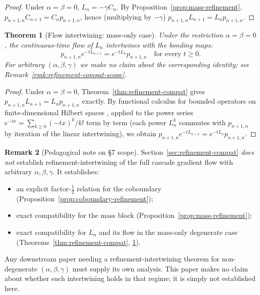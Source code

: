 \documentclass[11pt, a4paper]{amsart}
\newtheorem{theorem}{Theorem}[section]
\theoremstyle{definition}
\newtheorem{remark}[theorem]{Remark}
\begin{document}
\begin{proof}
Under $\alpha = \beta = 0$, $L_n = -\gamma C_n$. By
Proposition~\ref{prop:mass-refinement}, $p_{n+1, n} C_{n+1} =
C_n p_{n+1, n}$, hence (multiplying by $-\gamma$) $p_{n+1, n}
L_{n+1} = L_n p_{n+1, n}$.
\end{proof}

\begin{theorem}[Flow intertwining: mass-only case]
\label{thm:flow-intertwining}
Under the restriction $\alpha = \beta = 0$, the continuous-time
flow of $L_n$ intertwines with the bonding maps:
\[
  p_{n+1, n} e^{-t L_{n+1}} = e^{-t L_n} p_{n+1, n}
  \quad \text{for every } t \geq 0.
\]
For arbitrary $(\alpha, \beta, \gamma)$ we make no claim about the
corresponding identity; see
Remark~\ref{rmk:refinement-compat-scope}.
\end{theorem}

\begin{proof}
Under $\alpha = \beta = 0$, Theorem~\ref{thm:refinement-compat}
gives $p_{n+1, n} L_{n+1} = L_n p_{n+1, n}$ exactly. By functional
calculus for bounded operators on finite-dimensional Hilbert
spaces \cite[Thm.~VIII.5]{ReedSimonI}, applied to the power series
$e^{-tx} = \sum_{k \geq 0} (-tx)^k / k!$ term by term (each power
$L_n^k$ commutes with $p_{n+1, n}$ by iteration of the linear
intertwining), we obtain
$p_{n+1, n} e^{-t L_{n+1}} = e^{-t L_n} p_{n+1, n}$.
\end{proof}

\begin{remark}[Pedagogical note on §7 scope]
\label{rmk:section7-scope}
Section~\ref{sec:refinement-compat} \emph{does not} establish
refinement-intertwining of the full cascade gradient flow with
arbitrary $\alpha, \beta, \gamma$. It establishes:
\begin{itemize}
\item an explicit factor-$\tfrac{1}{2}$ relation for the
  coboundary (Proposition~\ref{prop:coboundary-refinement});
\item exact compatibility for the mass block
  (Proposition~\ref{prop:mass-refinement});
\item exact compatibility for $L_n$ and its flow in the mass-only
  degenerate case
  (Theorems~\ref{thm:refinement-compat}, \ref{thm:flow-intertwining}).
\end{itemize}
Any downstream paper needing a refinement-intertwining theorem
for non-degenerate $(\alpha, \beta, \gamma)$ must supply its own
analysis. This paper makes no claim about whether such intertwining
holds in that regime; it is simply not established here.
\end{remark}
\end{document}
